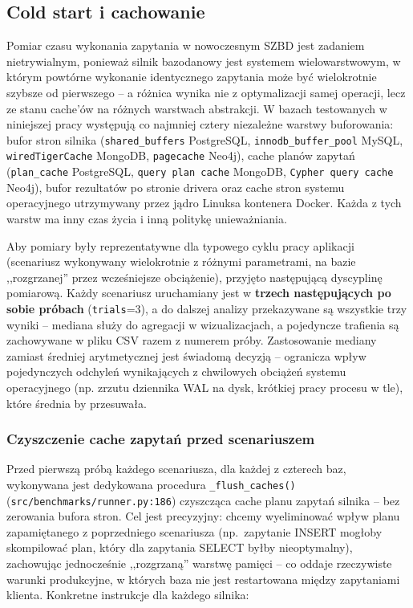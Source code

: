\subsection{Cold start i cachowanie}

Pomiar czasu wykonania zapytania w nowoczesnym SZBD jest zadaniem
nietrywialnym, ponieważ silnik bazodanowy jest systemem wielowarstwowym,
w którym powtórne wykonanie identycznego zapytania może być wielokrotnie
szybsze od pierwszego -- a różnica wynika nie z optymalizacji samej
operacji, lecz ze stanu cache'ów na różnych warstwach abstrakcji. W bazach
testowanych w niniejszej pracy występują co najmniej cztery niezależne
warstwy buforowania: bufor stron silnika (\texttt{shared\_buffers}
PostgreSQL, \texttt{innodb\_buffer\_pool} MySQL, \texttt{wiredTigerCache}
MongoDB, \texttt{pagecache} Neo4j), cache planów zapytań (\texttt{plan\_cache}
PostgreSQL, \texttt{query plan cache} MongoDB, \texttt{Cypher query cache}
Neo4j), bufor rezultatów po stronie drivera oraz cache stron systemu
operacyjnego utrzymywany przez jądro Linuksa kontenera Docker. Każda
z tych warstw ma inny czas życia i inną politykę unieważniania.

Aby pomiary były reprezentatywne dla typowego cyklu pracy aplikacji
(scenariusz wykonywany wielokrotnie z różnymi parametrami, na bazie
,,rozgrzanej'' przez wcześniejsze obciążenie), przyjęto następującą
dyscyplinę pomiarową. Każdy scenariusz uruchamiany jest w
\textbf{trzech następujących po sobie próbach} (\texttt{trials}=3),
a do dalszej analizy przekazywane są wszystkie trzy wyniki -- mediana
służy do agregacji w wizualizacjach, a pojedyncze trafienia są
zachowywane w pliku CSV razem z numerem próby. Zastosowanie mediany
zamiast średniej arytmetycznej jest świadomą decyzją -- ogranicza
wpływ pojedynczych odchyleń wynikających z chwilowych obciążeń
systemu operacyjnego (np. zrzutu dziennika WAL na dysk, krótkiej
pracy procesu w tle), które średnia by przesuwała.

\subsubsection*{Czyszczenie cache zapytań przed scenariuszem}

Przed pierwszą próbą każdego scenariusza, dla każdej z czterech baz,
wykonywana jest dedykowana procedura \texttt{\_flush\_caches()}
(\texttt{src/benchmarks/runner.py:186}) czyszcząca cache planu zapytań
silnika -- bez zerowania bufora stron. Cel jest precyzyjny: chcemy
wyeliminować wpływ planu zapamiętanego z poprzedniego scenariusza
(np.~zapytanie INSERT mogłoby skompilować plan, który dla zapytania
SELECT byłby nieoptymalny), zachowując jednocześnie ,,rozgrzaną''
warstwę pamięci -- co oddaje rzeczywiste warunki produkcyjne, w
których baza nie jest restartowana między zapytaniami klienta.
Konkretne instrukcje dla każdego silnika:

